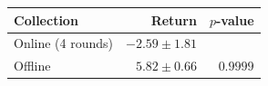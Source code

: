 \begin{tabular}{lrr}
\hline
Collection & Return & $p$-value \\
\hline
Online (4 rounds) & $-2.59 \pm 1.81$ & \\
Offline & $5.82 \pm 0.66$ & $0.9999$ \\
\hline
\end{tabular}
